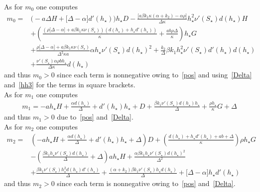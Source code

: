 \documentclass[reqno,11pt]{amsart}
\numberwithin{equation}{section}
\begin{document}
\begin{appendix}
 As for $m_0$ one computes
\begin{align*}
m_0=&\Big(-a \Delta  H+ \big[\Delta- \alpha\big] d'(h_\star) \Big)h_\star D-\frac{\big[a \beta  k_1  \kappa (\alpha+k_2) -\alpha \rho \big]}{\Delta \kappa } h_\star^2 \nu'(S_\star) d(h_\star)  H\\
&+\left(\frac{\left( \rho \big[\Delta- \alpha\big]+a\beta k_1  \kappa   \nu(S_\star)\right)\left(  d(h_\star)+h_\star d'(h_\star)\right)}{ \kappa }+\frac{a b \rho \Delta }{\kappa}\right)h_\star G\\
&+\frac{\rho \big[\Delta- \alpha\big]+ a \beta k_1  \kappa \nu(S_\star) }{\Delta^{2} \kappa a}\alpha h_\star  \nu'(S_\star) d(h_\star) ^{2}+\frac{k_2}{\Delta} \beta k_1  h_\star^2   \nu'(S_\star) d'(h_\star)  d(h_\star)\\
&+\frac{ \nu'(S_\star) \alpha \rho b h_\star}{\Delta \kappa} d(h_\star) 
\end{align*} 
and thus $m_0>0$ since each term is nonnegative owing to~\eqref{pos} and using~\eqref{Delta} and~\eqref{hh3} for the terms in square brackets.\\

 As for $m_1$ one computes
\begin{align*}
m_1=-a h_\star H+\frac{\alpha d(h_\star) }{\Delta}+d'(h_\star)  h_\star+D+\frac{\beta k_1   \nu'(S_\star)  d(h_\star)  h_\star}{\Delta}+\frac{\rho h_\star }{\kappa}G+\Delta
\end{align*} 
and thus $m_1>0$ due to~\eqref{pos} and~\eqref{Delta}.\\



 As for $m_2$ one computes
\begin{align*}
m_2=& \left(-a h_\star H+\frac{\alpha d(h_\star) }{\Delta}+d'(h_\star)  h_\star+\Delta\right) D+
\left(\frac{ d(h_\star)+h_\star  d'(h_\star)+a b   + \Delta}{\kappa}\right) \rho h_\star G\\
&-\left(\frac{ \beta k_1  h_\star   \nu'(S_\star) d(h_\star) }{\Delta}+ \Delta \right)ah_\star H+\frac{\alpha \beta  k_1  h_\star  \nu'(S_\star) d(h_\star) ^{2}}{\Delta^{2}}\\
&+\frac{\beta k_1  \nu'(S_\star)   h_\star^{2} d(h_\star) d'(h_\star) }{\Delta}+\frac{(\alpha+k_2)   \beta  k_1\nu'(S_\star) h_\star d(h_\star)}{\Delta} +\big[\Delta- \alpha\big]  h_\star d'(h_\star) 
\end{align*} 
and thus $m_2>0$ since each term is nonnegative owing to~\eqref{pos} and~\eqref{Delta}.\\




\end{appendix}
\end{document}
